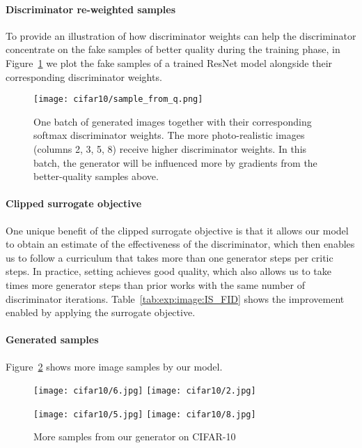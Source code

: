 \documentclass{article}
\newcommand{\0}{\bm{0}}
\begin{document}
\paragraph{Discriminator re-weighted samples}  
To provide an illustration of how discriminator weights can help the discriminator concentrate on the fake samples of better quality during the training phase, in Figure~\ref{fig:q_weights} we plot the fake samples of a trained ResNet model alongside their corresponding discriminator weights. 
\begin{figure}[h]
\begin{center}
\centerline{\texttt{[image: cifar10/sample\_from\_q.png]}}
\vskip -0.1in
\caption{One batch of generated images together with their corresponding softmax discriminator weights. The more photo-realistic images (columns 2, 3, 5, 8) receive higher discriminator weights. In this batch, the generator will be influenced more by gradients from the better-quality samples above.}
\label{fig:q_weights}
\end{center}
\vskip -0.3in
\end{figure}

\paragraph{Clipped surrogate objective}
One unique benefit of the clipped surrogate objective is that it allows our model to obtain an estimate of the effectiveness of the discriminator, which then enables us to follow a curriculum that takes more than one  generator steps per  critic steps. In practice, setting  achieves good quality, which also allows us to take  times more generator steps than prior works \cite{WGAN, wgangp, wwgan, SNGAN} with the same number of discriminator iterations.
Table~\ref{tab:exp:image:IS_FID} shows the improvement enabled by applying the surrogate objective.

\paragraph{Generated samples} 
Figure~\ref{appendix:fig:samples} shows more image samples by our model.

\begin{figure}[t]
\vskip 0.2in
\begin{center}
\centerline{\texttt{[image: cifar10/6.jpg]}
            \texttt{[image: cifar10/2.jpg]}}
\centerline{\texttt{[image: cifar10/5.jpg]}
            \texttt{[image: cifar10/8.jpg]}}
\caption{More samples from our generator on CIFAR-10}
\label{appendix:fig:samples}
\end{center}
\vskip -0.2in
\end{figure}
\end{document}
